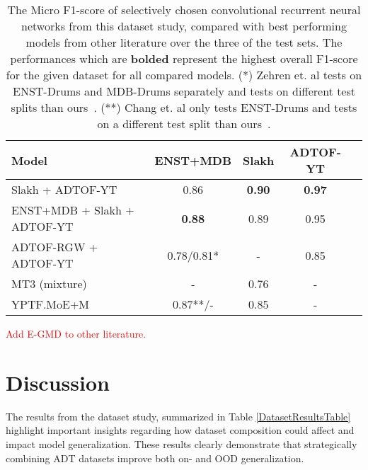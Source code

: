 \begin{table}[H]
    \centering
    \hspace*{-0.6cm}
    \begin{tabular}{l|cccc}
        Model & ENST+MDB & Slakh & ADTOF-YT      \\
        \hline
        Slakh + ADTOF-YT & 0.86	& \textbf{0.90}	& \textbf{0.97} \\
        ENST+MDB + Slakh + ADTOF-YT & \textbf{0.88}	& 0.89	& 0.95 \\
        \hline
        ADTOF-RGW + ADTOF-YT~\cite{signals4040042} & 0.78/0.81* & - & 0.85 \\
        \hline
        MT3 (mixture)~\cite{gardner2022mt3multitaskmultitrackmusic} & - & 0.76 & - \\
        \hline
        YPTF.MoE+M~\cite{chang2024yourmt3+} & 0.87**/- & 0.85 & - \\
    \end{tabular}
    \caption{The Micro F1-score of selectively chosen convolutional recurrent neural networks from this dataset study, compared with best performing models from other literature over the three of the test sets. The performances which are \textbf{bolded} represent the highest overall F1-score for the given dataset for all compared models.
    (*) Zehren et. al tests on ENST-Drums and MDB-Drums separately and tests on different test splits than ours~\cite{signals4040042}.
    (**) Chang et. al only tests ENST-Drums and tests on a different test split than ours~\cite{chang2024yourmt3+}.}
    \label{DatasetComparisonTable}
\end{table}

\textcolor{red}{Add E-GMD to other literature.}

\section{Discussion}

The results from the dataset study, summarized in Table \ref{DatasetResultsTable} highlight important insights regarding how dataset composition could affect and impact model generalization. These results clearly demonstrate that strategically combining \gls{ADT} datasets improve both on- and \acrfull{OOD} generalization.

